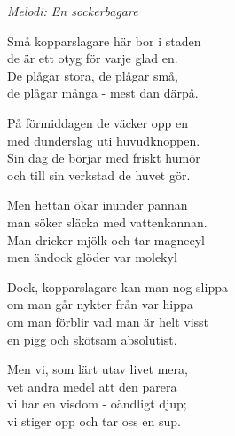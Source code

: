 {\footnotesize\textit{Melodi: En sockerbagare}}\par
\vspace{10pt}
Små kopparslagare här bor i staden\\
de är ett otyg för varje glad en.\\
De plågar stora, de plågar små,\\
de plågar många - mest dan därpå.\par
\vspace{10pt}
På förmiddagen de väcker opp en\\
med dunderslag uti huvudknoppen.\\
Sin dag de börjar med friskt humör\\
och till sin verkstad de huvet gör.\par
\vspace{10pt}
Men hettan ökar inunder pannan\\
man söker släcka med vattenkannan.\\
Man dricker mjölk och tar magnecyl\\
men ändock glöder var molekyl\par
\vspace{10pt}
Dock, kopparslagare kan man nog slippa\\
om man går nykter från var hippa\\
om man förblir vad man är helt visst\\
en pigg och skötsam absolutist.\par
\vspace{10pt}
Men vi, som lärt utav livet mera,\\
vet andra medel att den parera\\
vi har en visdom - oändligt djup;\\
vi stiger opp och tar oss en sup.
